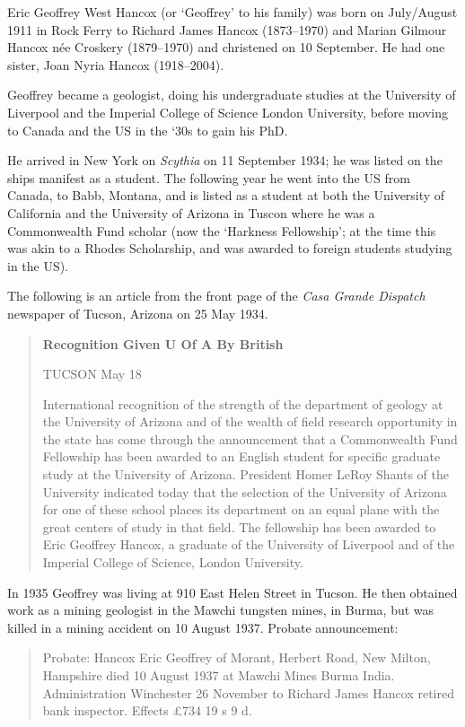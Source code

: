 
Eric Geoffrey West Hancox (or `Geoffrey' to his family) was  born on July/August 1911 in Rock Ferry\cite{EGWHbirth} to Richard James Hancox (1873--1970) and Marian Gilmour Hancox n\'{e}e Croskery (1879--1970) and christened on 10 September.\cite{EGWHchristening} He had one sister, Joan Nyria Hancox (1918--2004).

Geoffrey became a geologist, doing his undergraduate studies at the University of Liverpool and the Imperial College of Science London University, before moving to Canada and the US in the `30s to gain his PhD.

He arrived in New York on \emph{Scythia} on 11 September 1934; he was listed on the ships manifest as a student.\cite{NYpassengers}
The following year he went into the US from Canada, to Babb, Montana, and is listed as a student at both the University of California
and the University of Arizona in Tuscon\cite{USCanadaBorderCrossings} where he was a Commonwealth Fund scholar
(now the `Harkness Fellowship'; at the time this was akin to a Rhodes Scholarship, and was awarded to foreign students studying in the US).

The following is an article from the front page of the \emph{Casa Grande Dispatch} newspaper of Tucson, Arizona on 25 May 1934.\cite{CasaP1}

\begin{quotation}
\textbf{Recognition Given U Of A By British}

TUCSON May 18

International recognition of the strength of the department of geology at the University of Arizona and of the wealth of field research opportunity in the state has come through the announcement that a Commonwealth Fund Fellowship has been awarded to an English student for specific graduate study at the University of Arizona. President Homer LeRoy Shants of the University indicated today that the selection of the University of Arizona for one of these school places its department on an equal plane with the great centers of study in that field. The fellowship has been awarded to Eric Geoffrey Hancox, a graduate of the University of Liverpool and of the Imperial College of Science, London University.
\end{quotation}

In 1935 Geoffrey was living at 910 East Helen Street in Tucson.\cite{USCities}
He then obtained work as a mining geologist in  the Mawchi tungsten mines, in Burma, but was killed in a mining accident on 10 August 1937.
Probate announcement:\cite{EGWHprobate}
\begin{quotation}
Probate: Hancox Eric Geoffrey of Morant, Herbert Road, New Milton, Hampshire died 10 August 1937 at Mawchi Mines Burma India. Administration Winchester 26 November to Richard James Hancox retired bank inspector. Effects \pounds734 19 s 9 d.
\end{quotation}
